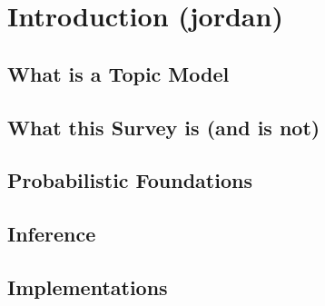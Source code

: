 
\chapter{Introduction (jordan)}
\label{ch:intro}

\section{What is a Topic Model}

\section{What this Survey is (and is not)}

\section{Probabilistic Foundations}

\section{Inference}

\section{Implementations}






